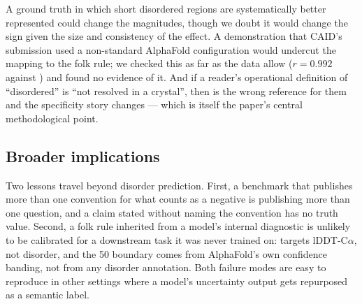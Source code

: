  A ground truth in which short disordered regions are
systematically better represented could change the \cfour magnitudes, though we doubt it would
change the sign given the size and consistency of the effect. A demonstration that CAID's
\afplddt submission used a non-standard AlphaFold configuration would undercut the mapping to
the folk rule; we checked this as far as the data allow ($r = 0.992$ against \afdb) and found no
evidence of it. And if a reader's operational definition of ``disordered'' is ``not resolved in
a crystal'', then \dnox is the wrong reference for them and the specificity story changes ---
which is itself the paper's central methodological point.

\subsection{Broader implications}

Two lessons travel beyond disorder prediction. First, a benchmark that publishes more than one
convention for what counts as a negative is publishing more than one question, and a claim
stated without naming the convention has no truth value. Second, a folk rule inherited from a
model's internal diagnostic is unlikely to be calibrated for a downstream task it was never
trained on: \plddt targets lDDT-C$\alpha$, not disorder, and the 50 boundary comes from
AlphaFold's own confidence banding, not from any disorder annotation. Both failure modes are
easy to reproduce in other settings where a model's uncertainty output gets repurposed as a
semantic label.
